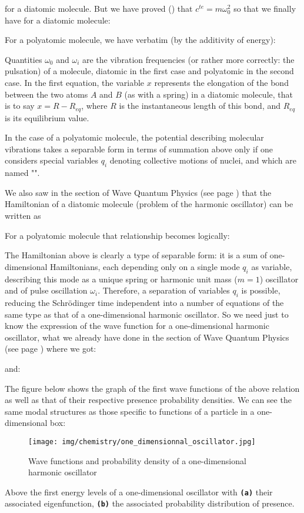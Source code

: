 	for a diatomic molecule. But we have proved () that $c^{te}=m\omega_0^2$ so that we finally have for a diatomic molecule:
	
	For a polyatomic molecule, we have verbatim (by the additivity of energy):
	
	Quantities $\omega_0$ and $\omega_i$ are the vibration frequencies (or rather more correctly: the pulsation) of a molecule, diatomic in the first case and polyatomic in the second case. In the first equation, the variable $x$ represents the elongation of the bond between the two atoms $A$ and $B$ (as with a spring) in a diatomic molecule, that is to say $x=R-R_{eq}$, where $R$ is the instantaneous length of this bond, and $R_{eq}$ is its equilibrium value.
	
	In the case of a polyatomic molecule, the potential describing molecular vibrations takes a separable form in terms of summation above only if one considers special variables $q_i$ denoting collective motions of nuclei, and which are named "".
	
	We also saw in the section of Wave Quantum Physics (see page \pageref{quantum harmonic oscillator}) that the Hamiltonian of a diatomic molecule (problem of the harmonic oscillator) can be written as
	
	For a polyatomic molecule that relationship becomes logically:
	
	The Hamiltonian above is clearly a type of separable form: it is a sum of one-dimensional Hamiltonians, each depending only on a single mode $q_i$ as variable, describing this mode as a unique spring or harmonic unit mass ($m=1$) oscillator and of pulse oscillation $\omega_i$. Therefore, a separation of variables $q_i$ is possible, reducing the Schrödinger time independent into a number of equations of the same type as that of a one-dimensional harmonic oscillator. So we need just to know the expression of the wave function for a one-dimensional harmonic oscillator, what we already have done in the section of Wave Quantum Physics (see page \pageref{quantum harmonic oscillator}) where we got:
	
	and:
	
	The figure below shows the graph of the first wave functions of the above relation as well as that of their respective presence probability densities. We can see the same modal structures as those specific to functions of a particle in a one-dimensional box:
	\begin{figure}[H]
		\begin{center}
		\texttt{[image: img/chemistry/one\_dimensionnal\_oscillator.jpg]}
		\end{center}	
		\caption{Wave functions and probability density of a one-dimensional harmonic oscillator}
	\end{figure}
	Above the first energy levels of a one-dimensional oscillator with \texttt{\textbf{(a)}} their associated eigenfunction, \texttt{\textbf{(b)}} the  associated probability distribution of presence.
	
